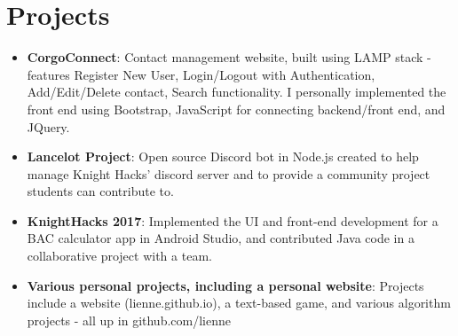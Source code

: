 \documentclass[letterpaper,11pt]{article}
\newcommand{\resumeItem}[2]{
  \item\small{
    \textbf{#1}{: #2 \vspace{-2pt}}
  }
}
\newcommand{\resumeSubItem}[2]{\resumeItem{#1}{#2}\vspace{-4pt}}
\newcommand{\resumeSubHeadingListStart}{\begin{itemize}[leftmargin=*]}
\newcommand{\resumeSubHeadingListEnd}{\end{itemize}}
\begin{document}
\section{Projects}
  \resumeSubHeadingListStart
    \resumeSubItem{CorgoConnect}
      {Contact management website, built using LAMP stack - features Register New User, Login/Logout with Authentication, Add/Edit/Delete contact, Search functionality. I personally implemented the front end using Bootstrap, JavaScript for connecting backend/front end, and JQuery.}
    \resumeSubItem{Lancelot Project}
      {Open source Discord bot in Node.js created to help manage Knight Hacks' discord server and to provide a community project students can contribute to.}
    \resumeSubItem{KnightHacks 2017}
      {Implemented the UI and front-end development for a BAC calculator app in Android Studio, and contributed Java code in a collaborative project with a team.}
    \resumeSubItem{Various personal projects, including a personal website}
      {Projects include a website (lienne.github.io), a text-based game, and various algorithm projects - all up in github.com/lienne}
  \resumeSubHeadingListEnd
    
    
\end{document}
